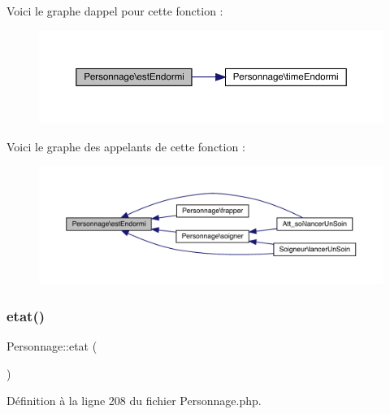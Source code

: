 Voici le graphe d\textquotesingle{}appel pour cette fonction \+:\nopagebreak
\begin{figure}[H]
\begin{center}
\leavevmode
\includegraphics[width=350pt]{class_personnage_aabf0bcd80fcea089de16f33c029aae12_cgraph}
\end{center}
\end{figure}
Voici le graphe des appelants de cette fonction \+:\nopagebreak
\begin{figure}[H]
\begin{center}
\leavevmode
\includegraphics[width=350pt]{class_personnage_aabf0bcd80fcea089de16f33c029aae12_icgraph}
\end{center}
\end{figure}
\mbox{\label{class_personnage_addeceec710baf3ae687f36151bc5def4}} 
\subsubsection{\texorpdfstring{etat()}{etat()}}
{\footnotesize\ttfamily Personnage\+::etat (\begin{DoxyParamCaption}{ }\end{DoxyParamCaption})}



Définition à la ligne 208 du fichier Personnage.\+php.

